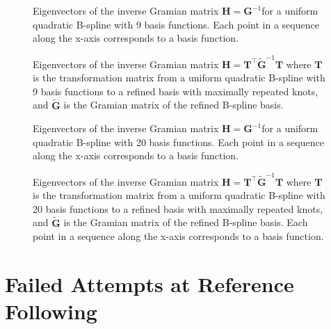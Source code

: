 \begin{figure}
    \centering
    
    \caption{Eigenvectors of the inverse Gramian matrix $\mathbf H = \mathbf{G}^{-1}$for a uniform quadratic B-spline with 9 basis functions. Each point in a sequence along the x-axis corresponds to a basis function.}
    \label{fig:basis-inverse-gramian-eigenvectors-9}
\end{figure}

\begin{figure}
    \centering
    
    \caption{Eigenvectors of the inverse Gramian matrix $\mathbf H = \mathbf T^\top \mathbf{\tilde G}^{-1} \mathbf T$ where $\mathbf T$ is the transformation matrix from a uniform quadratic B-spline with 9 basis functions to a refined basis with maximally repeated knots, and $\mathbf{\tilde G}$ is the Gramian matrix of the refined B-spline basis.}
    \label{fig:refined-basis-inverse-gramian-eigenvectors-9}
\end{figure}


\begin{figure}
    \centering
    
    \caption{Eigenvectors of the inverse Gramian matrix $\mathbf H = \mathbf{G}^{-1}$for a uniform quadratic B-spline with 20 basis functions. Each point in a sequence along the x-axis corresponds to a basis function.}
    \label{fig:basis-inverse-gramian-eigenvectors-20}
\end{figure}

\begin{figure}
    \centering
    
    \caption{Eigenvectors of the inverse Gramian matrix $\mathbf H = \mathbf T^\top \mathbf{\tilde G}^{-1} \mathbf T$ where $\mathbf T$ is the transformation matrix from a uniform quadratic B-spline with 20 basis functions to a refined basis with maximally repeated knots, and $\mathbf{\tilde G}$ is the Gramian matrix of the refined B-spline basis. Each point in a sequence along the x-axis corresponds to a basis function.}
    \label{fig:refined-basis-inverse-gramian-eigenvectors-20}
\end{figure}




\chapter{Failed Attempts at Reference Following}\label{app:failed-reference-following}

